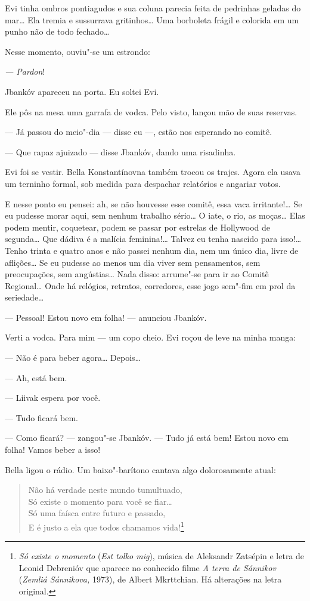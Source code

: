 Evi tinha ombros pontiagudos e sua coluna parecia feita de pedrinhas
geladas do mar\ldots{} Ela tremia e sussurrava gritinhos\ldots{} Uma borboleta
frágil e colorida em um punho não de todo fechado\ldots{}

Nesse momento, ouviu"-se um estrondo:

\emph{--- Pardon}!

Jbankóv apareceu na porta. Eu soltei Evi.

Ele pôs na mesa uma garrafa de vodca. Pelo visto, lançou mão de suas
reservas.

--- Já passou do meio"-dia --- disse eu ---, estão
nos esperando no comitê.

--- Que rapaz ajuizado --- disse Jbankóv, dando uma
risadinha.

Evi foi se vestir. Bella Konstantínovna também trocou os trajes. Agora
ela usava um terninho formal, sob medida para despachar relatórios e
angariar votos.

E nesse ponto eu pensei: ah, se não houvesse esse comitê, essa vaca
irritante!\ldots{} Se eu pudesse morar aqui, sem nenhum trabalho sério\ldots{} O
iate, o rio, as moças\ldots{} Elas podem mentir, coquetear, podem se passar
por estrelas de Hollywood de segunda\ldots{} Que dádiva é a malícia
feminina!\ldots{} Talvez eu tenha nascido para isso!\ldots{} Tenho trinta e quatro
anos e não passei nenhum dia, nem um único dia, livre de aflições\ldots{} Se
eu pudesse ao menos um dia viver sem pensamentos, sem preocupações, sem
angústias\ldots{} Nada disso: arrume"-se para ir ao Comitê Regional\ldots{} Onde há
relógios, retratos, corredores, esse jogo sem"-fim em prol da
seriedade\ldots{}

--- Pessoal! Estou novo em folha! --- anunciou Jbankóv.

Verti a vodca. Para mim --- um copo cheio. Evi roçou de leve na
minha manga:

--- Não é para beber agora\ldots{} Depois\ldots{}

--- Ah, está bem.

--- Liivak espera por você.

--- Tudo ficará bem.

--- Como ficará? --- zangou"-se Jbankóv. --- Tudo já
está bem! Estou novo em folha! Vamos beber a isso!

Bella ligou o rádio. Um baixo"-barítono cantava algo dolorosamente atual:

\begin{verse}
Não há verdade neste mundo tumultuado,\\
Só existe o momento para você se fiar\ldots{}\\
Só uma faísca entre futuro e passado,\\
E é justo a ela que todos chamamos vida!\footnote{\emph{Só existe o
  momento} (\emph{Est tolko mig}), música de Aleksandr Zatsépin e
  letra de Leonid Debrenióv que aparece no conhecido filme \emph{A terra
  de Sánnikov} (\emph{Zemliá Sánnikova,} 1973), de Albert
  Mkrttchian. Há alterações na letra original.}
\end{verse}

